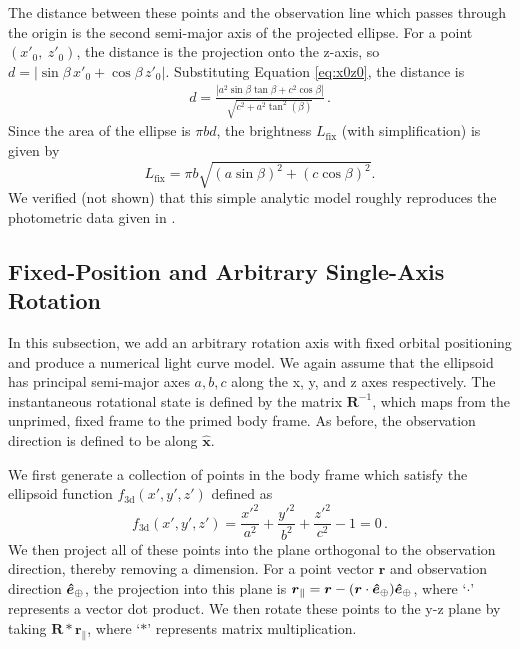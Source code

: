 \documentclass[twocolumn,doublespacing]{aastex631}
\begin{document}
The distance between these points and the observation line which passes through the origin is the second semi-major axis of the projected ellipse. For a point $(x'_0,\ z'_0)$, the distance is the projection onto the z-axis, so $d=|\sin\beta\, x'_0+\cos\beta\, z'_0|$. Substituting Equation \ref{eq:x0z0}, the distance is
\begin{equation}
\begin{aligned}
	d=\frac{|a^2\sin\beta\tan\beta+c^2\cos\beta|}{\sqrt{c^2+a^2\tan^2(\beta)}}\,.
\end{aligned}
\end{equation}
Since the area of the ellipse is $\pi b d$, the brightness $L_\text{fix}$ (with simplification) is given by
\begin{equation}\label{eq:fixedlightcurve}
	L_\text{fix}=\pi b\sqrt{(a\sin\beta)^2+(c\cos\beta)^2}. 
\end{equation}
We verified (not shown) that this simple analytic model roughly reproduces the photometric data given in \citet{belton2018}.

\subsection{Fixed-Position and Arbitrary Single-Axis Rotation}\label{subsec:arblightmodel}

In this subsection, we add an arbitrary rotation axis with fixed orbital positioning and produce a numerical light curve model. We again assume that the ellipsoid has principal semi-major axes $a,b,c$ along the x, y, and z axes respectively. The instantaneous rotational state is defined by the matrix $\boldsymbol{R}^{-1}$, which maps from the unprimed, fixed frame to the primed body frame. As before, the observation direction is defined to be along $\boldsymbol{\hat{x}}$. 

We first generate a collection of points in the body frame which satisfy the ellipsoid function $f_\text{3d}(x',y',z')$ defined as
\begin{equation}
  f_\text{3d}(x',y',z')= \frac{x'^2}{a^2}+\frac{y'^2}{b^2}+\frac{z'^2}{c^2}-1=0\,.
\end{equation}
We then project all of these points into the plane orthogonal to the observation direction, thereby removing a dimension. For a point vector $\boldsymbol{r}$ and observation direction $\boldsymbol{\hat{e}}_\oplus$, the projection into this plane is $\boldsymbol{r}_{\|}=\boldsymbol{r}-(\boldsymbol{r}\cdot\boldsymbol{\hat{e}}_\oplus)\boldsymbol{\hat{e}}_\oplus$, where `$\cdot$' represents a vector dot product. We then rotate these points to the y-z plane by taking $\boldsymbol{R}*\boldsymbol{r}_{\|}$, where `$*$' represents matrix multiplication. 
\end{document}
